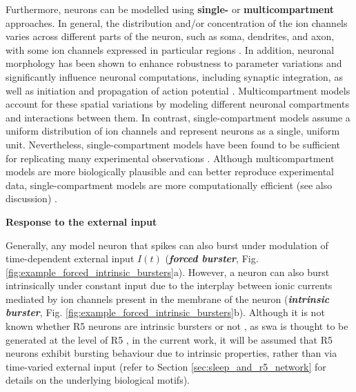 \documentclass[../main.tex]{subfiles}
\begin{document}
Furthermore, neurons can be modelled using \textbf{single-} or \textbf{multicompartment} approaches.
In general, the distribution and/or concentration of the ion channels varies across different parts of the neuron, such as soma, dendrites, and axon, with some ion channels expressed in particular regions \parencite{destexheDendriticLowthresholdCalcium1998,gunayDistalSpikeInitiation2015}.
In addition, neuronal morphology has been shown to enhance robustness to parameter variations and significantly influence neuronal computations, including synaptic integration, as well as initiation and propagation of action potential \parencite{destexheDendriticLowthresholdCalcium1998,gunayDistalSpikeInitiation2015,cuntzOneRuleGrow2010}.
Multicompartment models account for these spatial variations by modeling different neuronal compartments and interactions between them. In contrast, single-compartment models assume a uniform distribution of ion channels and represent neurons as a single, uniform unit. Nevertheless, single-compartment models have been found to be sufficient for replicating many experimental observations \parencite{wangMultipleDynamicalModes1994,golombContributionPersistentNa2006,destexheDendriticLowthresholdCalcium1998,liuMultipleConductancesCooperatively2008,vickstromTTypeCalciumChannels2020}.
Although multicompartment models are more biologically plausible and can better reproduce experimental data, single-compartment models are more computationally efficient (see also discussion) \parencite{destexheDendriticLowthresholdCalcium1998}.


\vspace*{0.3cm}
\noindent\textbf{Response to the external input}

Generally, any model neuron that spikes can also burst under modulation of
time-dependent external input $I(t)$ \parencite{izhikevichDynamicalSystemsNeuroscience2006}
(\textbf{\textit{forced burster}}, Fig. \ref{fig:example_forced_intrinsic_bursters}a).
However, a neuron can also burst intrinsically under constant input due to the interplay
between ionic currents mediated by ion channels present in the membrane of the neuron
(\textbf{\textit{intrinsic burster}}, Fig. \ref{fig:example_forced_intrinsic_bursters}b).
Although it is not known whether R5 neurons are intrinsic bursters or not
\parencite{raccugliaNetworkSpecificSynchronizationElectrical2019}, as \gls{swa}
is thought to be generated at the level of R5 \parencite{raccugliaNetworkSpecificSynchronizationElectrical2019},
in the current work, it will be assumed that R5 neurons exhibit bursting behaviour
due to intrinsic properties, rather than via time-varied external input (refer to Section \ref{sec:sleep_and_r5_network} for details on the underlying biological motifs).
\end{document}

